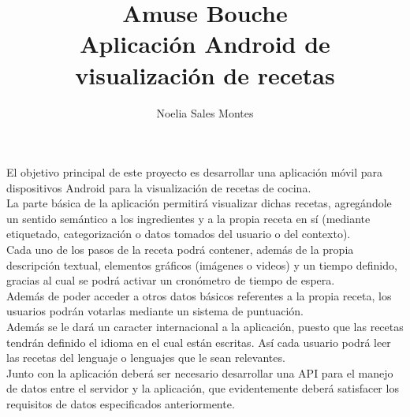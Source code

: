 \documentclass[a4paper,11pt]{article}
\title{Amuse Bouche\\Aplicación Android de visualización de recetas}
\author{Noelia Sales Montes}
\date{\fecha}
\begin{document}
\maketitle

\vspace*{1cm}

El objetivo principal de este proyecto es desarrollar una aplicación móvil para dispositivos Android para la visualización de recetas de cocina.\\

La parte básica de la aplicación permitirá visualizar dichas recetas, agregándole un sentido semántico a los ingredientes y a la propia receta en sí (mediante etiquetado, categorización o datos tomados del usuario o del contexto).\\

Cada uno de los pasos de la receta podrá contener, además de la propia descripción textual, elementos gráficos (imágenes o videos) y un tiempo definido, gracias al cual se podrá activar un cronómetro de tiempo de espera.\\

Además de poder acceder a otros datos básicos referentes a la propia receta, los usuarios podrán votarlas mediante un sistema de puntuación.\\

Además se le dará un caracter internacional a la aplicación, puesto que las recetas tendrán definido el idioma en el cual están escritas. Así cada usuario podrá leer las recetas del lenguaje o lenguajes que le sean relevantes.\\

Junto con la aplicación deberá ser necesario desarrollar una API para el manejo de datos entre el servidor y la aplicación, que evidentemente deberá satisfacer los requisitos de datos especificados anteriormente.
\end{document}
